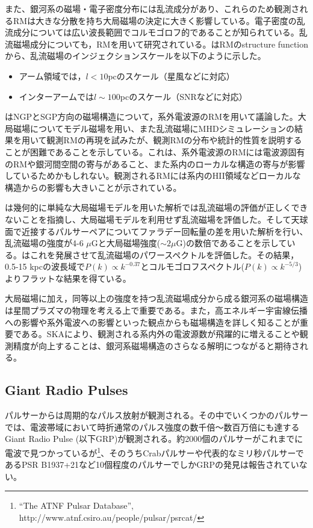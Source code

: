 また、銀河系の磁場・電子密度分布には乱流成分があり、これらのため観測されるRMは大きな分散を持ち大局磁場の決定に大きく影響している。電子密度の乱流成分については広い波長範囲でコルモゴロフ的であることが知られている\citep{ARM1995}。乱流磁場成分についても，RMを用いて研究されている。\cite{HBGM2008}はRMのstructure functionから、乱流磁場のインジェクションスケールを以下のように示した。
\begin{itemize}
\item アーム領域では，$l < 10$pcのスケール（星風などに対応）
\item インターアームでは$l \sim 100$pcのスケール（SNRなどに対応）
\end{itemize}
\cite{ARKG2013}はNGPとSGP方向の磁場構造について，系外電波源のRMを用いて議論した。大局磁場についてモデル磁場を用い、また乱流磁場にMHDシミュレーションの結果を用いて観測RMの再現を試みたが、観測RMの分布や統計的性質を説明することが困難であることを示している。これは、系外電波源のRMには電波源固有のRMや銀河間空間の寄与があること、また系内のローカルな構造の寄与が影響しているためかもしれない。観測されるRMには系内のHII領域などローカルな構造からの影響も大きいことが示されている\citep{MITRA2003,STS2011}。

\cite{OS1993}は幾何的に単純な大局磁場モデルを用いた解析では乱流磁場の評価が正しくできないことを指摘し、大局磁場モデルを利用せず乱流磁場を評価した。そして天球面で近接するパルサーペアについてファラデー回転量の差を用いた解析を行い、乱流磁場の強度が4-6 $\mu$Gと大局磁場強度($\sim 2 \mu$G)の数倍であることを示している。\cite{HAN2004}はこれを発展させて乱流磁場のパワースペクトルを評価した。その結果，0.5-15 kpcの波長域で$P(k) \propto k^{-0.37}$とコルモゴロフスペクトル($P(k) \propto k^{-5/3}$)よりフラットな結果を得ている。

大局磁場に加え，同等以上の強度を持つ乱流磁場成分から成る銀河系の磁場構造は星間プラズマの物理を考える上で重要である。また，高エネルギー宇宙線伝播への影響や系外電波への影響といった観点からも磁場構造を詳しく知ることが重要である。SKAにより、観測される系内外の電波源数が飛躍的に増えることや観測精度が向上することは、銀河系磁場構造のさらなる解明につながると期待される。



\subsection{Giant Radio Pulses}

パルサーからは周期的なパルス放射が観測される。その中でいくつかのパルサーでは、電波帯域において時折通常のパルス強度の数千倍～数百万倍にも達するGiant Radio Pulse (以下GRP)が観測される。約2000個のパルサーがこれまでに電波で見つかっているが\citep{Ma05}\footnote{``The ATNF Pulsar Database'', http://www.atnf.csiro.au/people/pulsar/psrcat/}、そのうちCrabパルサーや代表的なミリ秒パルサーであるPSR B1937+21など10個程度のパルサーでしかGRPの発見は報告されていない\citep{So04,RJ01}。

